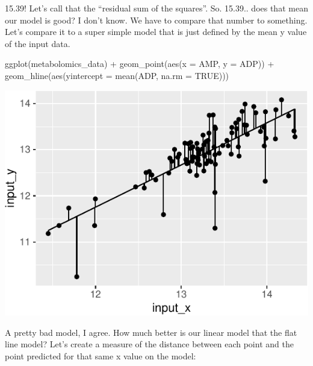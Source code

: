 \documentclass[
]{krantz}
\newenvironment{Shaded}{\begin{snugshade}}{\end{snugshade}}
\newcommand{\AttributeTok}[1]{\textcolor[rgb]{0.77,0.63,0.00}{#1}}
\newcommand{\ConstantTok}[1]{\textcolor[rgb]{0.00,0.00,0.00}{#1}}
\newcommand{\FunctionTok}[1]{\textcolor[rgb]{0.00,0.00,0.00}{#1}}
\newcommand{\NormalTok}[1]{#1}
\newcommand{\SpecialCharTok}[1]{\textcolor[rgb]{0.00,0.00,0.00}{#1}}
\begin{document}
15.39! Let's call that the ``residual sum of the squares''. So. 15.39.. does that mean our model is good? I don't know. We have to compare that number to something. Let's compare it to a super simple model that is just defined by the mean y value of the input data.

\begin{Shaded}
\begin{Highlighting}[]
\FunctionTok{ggplot}\NormalTok{(metabolomics\_data) }\SpecialCharTok{+}
  \FunctionTok{geom\_point}\NormalTok{(}\FunctionTok{aes}\NormalTok{(}\AttributeTok{x =}\NormalTok{ AMP, }\AttributeTok{y =}\NormalTok{ ADP)) }\SpecialCharTok{+}
  \FunctionTok{geom\_hline}\NormalTok{(}\FunctionTok{aes}\NormalTok{(}\AttributeTok{yintercept =} \FunctionTok{mean}\NormalTok{(ADP, }\AttributeTok{na.rm =} \ConstantTok{TRUE}\NormalTok{)))}
\end{Highlighting}
\end{Shaded}

\begin{center}\includegraphics[width=0.8\linewidth]{index_files/figure-latex/unnamed-chunk-127-1} \end{center}

A pretty bad model, I agree. How much better is our linear model that the flat line model? Let's create a measure of the distance between each point and the point predicted for that same x value on the model:
\end{document}
